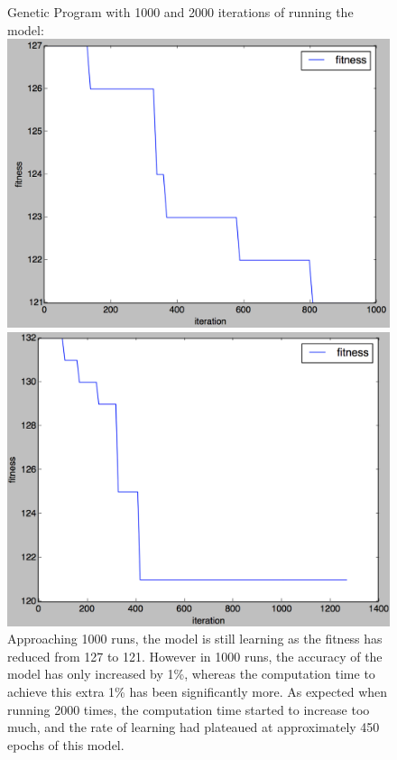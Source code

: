 \documentclass[11pt]{article}
\begin{document}
\begin{figure}
\centering
Genetic Program with 1000 and 2000 iterations of running the model:
\includegraphics[scale = .4]{2k}
\includegraphics[scale = .4]{3k}
Approaching 1000 runs, the model is still learning as the fitness has reduced from 127 to 121. However in 1000 runs, the accuracy of the model has only increased by 1\%, whereas the computation time to achieve this extra 1\% has been significantly more. As expected when running 2000 times, the computation time started to increase too much, and the rate of learning had plateaued at approximately 450 epochs of this model. 
\end{figure}
\end{document}
